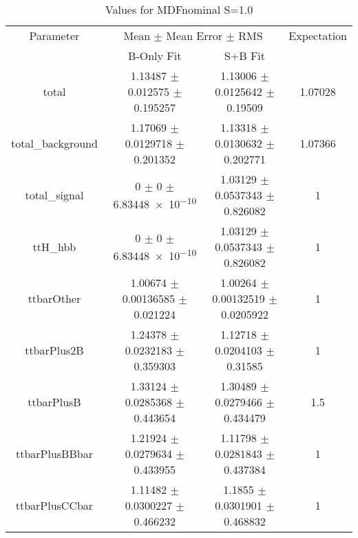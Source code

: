 \begin{table}
\centering
\caption{Values for MDFnominal S=1.0}
\begin{tabular}{cccc}
\toprule
Parameter & \multicolumn{2}{c}{Mean $\pm$ Mean Error $\pm$ RMS} & Expectation\\
 & B-Only Fit & S+B Fit & \\
\midrule
total & \num{1.13487} $\pm$ \num{0.012575} $\pm$ \num{0.195257} & \num{1.13006} $\pm$ \num{0.0125642} $\pm$ \num{0.19509} & \num{1.07028}\\
total\_background & \num{1.17069} $\pm$ \num{0.0129718} $\pm$ \num{0.201352} & \num{1.13318} $\pm$ \num{0.0130632} $\pm$ \num{0.202771} & \num{1.07366}\\
total\_signal & \num{0} $\pm$ \num{0} $\pm$ \num{6.83448e-10} & \num{1.03129} $\pm$ \num{0.0537343} $\pm$ \num{0.826082} & \num{1}\\
ttH\_hbb & \num{0} $\pm$ \num{0} $\pm$ \num{6.83448e-10} & \num{1.03129} $\pm$ \num{0.0537343} $\pm$ \num{0.826082} & \num{1}\\
ttbarOther & \num{1.00674} $\pm$ \num{0.00136585} $\pm$ \num{0.021224} & \num{1.00264} $\pm$ \num{0.00132519} $\pm$ \num{0.0205922} & \num{1}\\
ttbarPlus2B & \num{1.24378} $\pm$ \num{0.0232183} $\pm$ \num{0.359303} & \num{1.12718} $\pm$ \num{0.0204103} $\pm$ \num{0.31585} & \num{1}\\
ttbarPlusB & \num{1.33124} $\pm$ \num{0.0285368} $\pm$ \num{0.443654} & \num{1.30489} $\pm$ \num{0.0279466} $\pm$ \num{0.434479} & \num{1.5}\\
ttbarPlusBBbar & \num{1.21924} $\pm$ \num{0.0279634} $\pm$ \num{0.433955} & \num{1.11798} $\pm$ \num{0.0281843} $\pm$ \num{0.437384} & \num{1}\\
ttbarPlusCCbar & \num{1.11482} $\pm$ \num{0.0300227} $\pm$ \num{0.466232} & \num{1.1855} $\pm$ \num{0.0301901} $\pm$ \num{0.468832} & \num{1}\\
\bottomrule
\end{tabular}
\end{table}